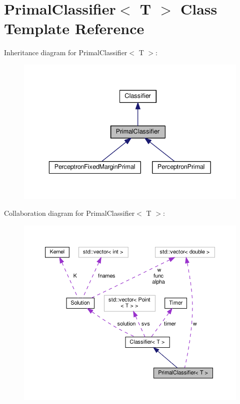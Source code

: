 \hypertarget{class_primal_classifier}{}\section{Primal\+Classifier$<$ T $>$ Class Template Reference}
\label{class_primal_classifier}


Inheritance diagram for Primal\+Classifier$<$ T $>$\+:\nopagebreak
\begin{figure}[H]
\begin{center}
\leavevmode
\includegraphics[width=336pt]{class_primal_classifier__inherit__graph}
\end{center}
\end{figure}


Collaboration diagram for Primal\+Classifier$<$ T $>$\+:
\nopagebreak
\begin{figure}[H]
\begin{center}
\leavevmode
\includegraphics[width=350pt]{class_primal_classifier__coll__graph}
\end{center}
\end{figure}
